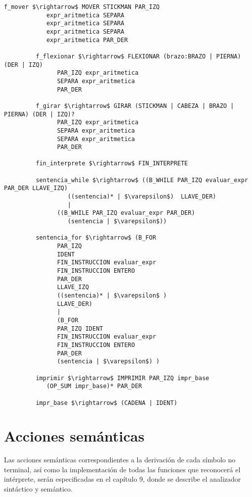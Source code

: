 \begin{lstlisting}[escapechar=\$]
         f_mover $\rightarrow$ MOVER STICKMAN PAR_IZQ
            expr_aritmetica SEPARA
            expr_aritmetica SEPARA
            expr_aritmetica SEPARA
            expr_aritmetica PAR_DER 
         
         f_flexionar $\rightarrow$ FLEXIONAR (brazo:BRAZO | PIERNA) (DER | IZQ) 
               PAR_IZQ expr_aritmetica 
               SEPARA expr_aritmetica 
               PAR_DER
         
         f_girar $\rightarrow$ GIRAR (STICKMAN | CABEZA | BRAZO | PIERNA) (DER | IZQ)?
               PAR_IZQ expr_aritmetica 
               SEPARA expr_aritmetica 
               SEPARA expr_aritmetica 
               PAR_DER
         
         fin_interprete $\rightarrow$ FIN_INTERPRETE
         
         sentencia_while $\rightarrow$ ((B_WHILE PAR_IZQ evaluar_expr PAR_DER LLAVE_IZQ) 
                  ((sentencia)* | $\varepsilon$)  LLAVE_DER)
                  |
               ((B_WHILE PAR_IZQ evaluar_expr PAR_DER)
                  (sentencia | $\varepsilon$))

         sentencia_for $\rightarrow$ (B_FOR 
               PAR_IZQ 
               IDENT 
               FIN_INSTRUCCION evaluar_expr 
               FIN_INSTRUCCION ENTERO 
               PAR_DER 
               LLAVE_IZQ
               ((sentencia)* | $\varepsilon$ ) 
               LLAVE_DER)
               |  
               (B_FOR 
               PAR_IZQ IDENT 
               FIN_INSTRUCCION evaluar_expr 
               FIN_INSTRUCCION ENTERO 
               PAR_DER
               (sentencia | $\varepsilon$) )

         imprimir $\rightarrow$ IMPRIMIR PAR_IZQ impr_base
            (OP_SUM impr_base)* PAR_DER
         
         impr_base $\rightarrow$ (CADENA | IDENT)
       \end{lstlisting}


   \section{Acciones semánticas}
   Las acciones semánticas correspondientes a la derivación de cada símbolo no terminal, así como la implementación de todas las
   funciones que reconocerá el intérprete, serán especificadas en el capítulo 9, donde se describe el analizador sintáctico y semántico. 















